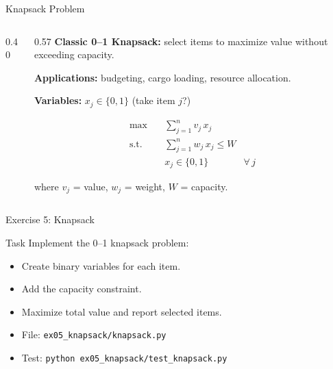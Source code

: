 \documentclass[aspectratio=169,10pt]{beamer}
\begin{document}
\begin{frame}{Knapsack Problem}
\begin{columns}[T]
\begin{column}{0.40\textwidth}
\begin{center}
\end{center}
\end{column}
\begin{column}{0.57\textwidth}
\textbf{Classic 0--1 Knapsack:} select items to maximize value
without exceeding capacity.

\smallskip
{\small\textbf{Applications:} budgeting, cargo loading, resource allocation.}

\smallskip
\textbf{Variables:} $x_j \in \{0,1\}$ (take item $j$?)

\begin{align*}
  \max \quad & \sum_{j=1}^{n} v_j \, x_j \\
  \text{s.t.} \quad
    & \sum_{j=1}^{n} w_j \, x_j \le W \\
    & x_j \in \{0,1\} & \forall\, j
\end{align*}

{\small where $v_j$ = value, $w_j$ = weight, $W$ = capacity.}

\end{column}
\end{columns}
\end{frame}

\begin{frame}{Exercise 5: Knapsack}
\begin{block}{Task}
Implement the 0--1 knapsack problem:
\begin{itemize}
  \item Create binary variables for each item.
  \item Add the capacity constraint.
  \item Maximize total value and report selected items.
\end{itemize}
\end{block}
\begin{itemize}
  \item File: \texttt{ex05\_knapsack/knapsack.py}
  \item Test: \texttt{python ex05\_knapsack/test\_knapsack.py}
\end{itemize}
\end{frame}
\end{document}
